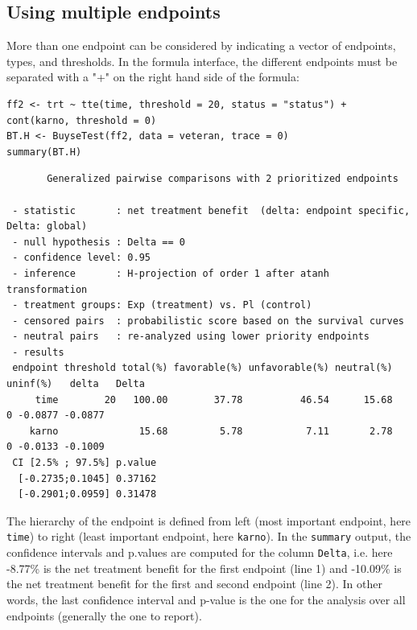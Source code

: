 \documentclass[12pt]{article}
\begin{document}
\clearpage

\subsection{Using multiple endpoints}
\label{sec:orga747e8b}

More than one endpoint can be considered by indicating a vector of
endpoints, types, and thresholds. In the formula interface, the
different endpoints must be separated with a "+" on the right hand
side of the formula:
\lstset{language=r,label= ,caption= ,captionpos=b,numbers=none}
\begin{lstlisting}
ff2 <- trt ~ tte(time, threshold = 20, status = "status") + cont(karno, threshold = 0)
BT.H <- BuyseTest(ff2, data = veteran, trace = 0)
summary(BT.H)
\end{lstlisting}

\begin{verbatim}
       Generalized pairwise comparisons with 2 prioritized endpoints

 - statistic       : net treatment benefit  (delta: endpoint specific, Delta: global) 
 - null hypothesis : Delta == 0 
 - confidence level: 0.95 
 - inference       : H-projection of order 1 after atanh transformation 
 - treatment groups: Exp (treatment) vs. Pl (control) 
 - censored pairs  : probabilistic score based on the survival curves
 - neutral pairs   : re-analyzed using lower priority endpoints
 - results
 endpoint threshold total(%) favorable(%) unfavorable(%) neutral(%) uninf(%)   delta   Delta
     time        20   100.00        37.78          46.54      15.68        0 -0.0877 -0.0877
    karno              15.68         5.78           7.11       2.78        0 -0.0133 -0.1009
 CI [2.5% ; 97.5%] p.value 
  [-0.2735;0.1045] 0.37162 
  [-0.2901;0.0959] 0.31478
\end{verbatim}

The hierarchy of the endpoint is defined from left (most important
endpoint, here \texttt{time}) to right (least important endpoint, here
\texttt{karno}). In the \texttt{summary} output, the confidence intervals and
p.values are computed for the column \texttt{Delta}, i.e. here -8.77\% is the
net treatment benefit for the first endpoint (line 1) and -10.09\% is the net
treatment benefit for the first and second endpoint (line 2). In other words,
the last confidence interval and p-value is the one for the analysis
over all endpoints (generally the one to report).

\bigskip
\end{document}
